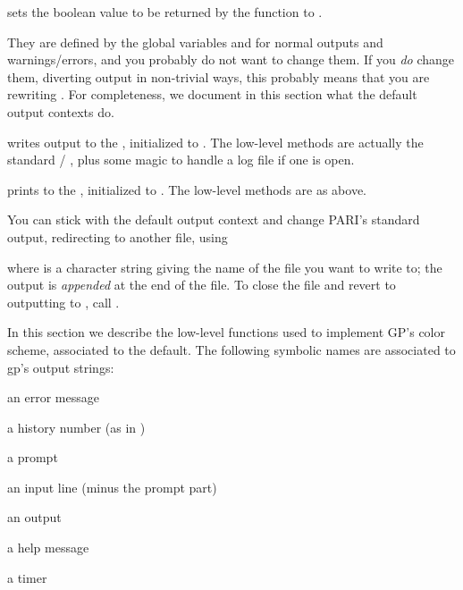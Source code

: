  sets the boolean value
to be returned by the function  to .

 They are defined by the global variables
 and  for normal outputs and warnings/errors, and you
probably do not want to change them. If you \emph{do} change them, diverting
output in non-trivial ways, this probably means that you are rewriting
. For completeness, we document in this section what the default
output contexts do.

 writes output to the  ,
initialized to .  The low-level methods are actually the standard
 / , plus some magic to handle a log file if one is
open.

 prints to the  , initialized
to . The low-level methods are as above.

You can stick with the default  output context and change PARI's
standard output, redirecting  to another file, using

 where  is a character string
giving the name of the file you want to write to; the output is
\emph{appended} at the end of the file. To close the file and revert to
outputting to , call .

In this section we describe the low-level functions used to implement GP's
color scheme, associated to the  default. The following symbolic
names are associated to gp's output strings:

\item {} an error message

\item {} a history number (as in )

\item {} a prompt

\item {} an input line (minus the prompt part)

\item {} an output

\item {} a help message

\item {} a timer

